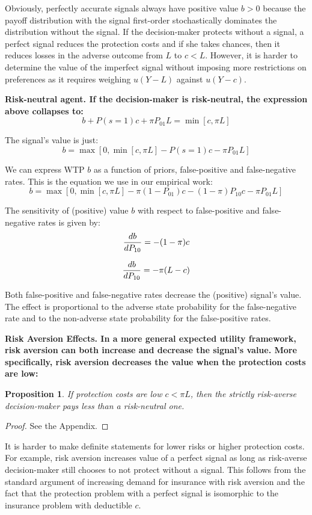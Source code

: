 \documentclass[12pt,a4paper]{article}
\newtheorem{theorem}{Proposition}
\begin{document}
Obviously, perfectly accurate signals always have positive value $b>0$ because the payoff distribution with the signal first-order stochastically dominates the distribution without the signal. If the decision-maker protects without a signal, a perfect signal reduces the protection costs and if she takes chances, then it reduces losses in the adverse outcome from $L$ to $c<L$.  However, it is harder to determine the value of the imperfect signal without imposing more restrictions on preferences as it requires weighing $u(Y-L)$ against $u(Y-c)$.


\vspace{10pt}
\bf Risk-neutral agent. \rm If the decision-maker is risk-neutral, the expression above collapses to:
$$b+P(s=1)c+\pi P_{01}L=\min[c,\pi L]$$

The signal's value is just:
\begin{equation}
b=\max[0,\min[c,\pi L]-P(s=1)c-\pi P_{01}L]
\end{equation}

We can express WTP $b$ as a function of priors, false-positive and false-negative rates. This is the equation we use in our empirical work:
\begin{equation}
b=\max[0,\min[c,\pi L]-\pi (1-P_{01})c-(1-\pi)P_{10}c-\pi P_{01}L]
\end{equation}

The sensitivity of (positive) value $b$ with respect to false-positive and false-negative rates is given by:
\begin{equation}
{db\over dP_{10}}=-(1-\pi)c
\end{equation}

\begin{equation}
{db\over dP_{10}}=-\pi(L-c)
\end{equation}
\vspace{10pt}

Both false-positive and false-negative rates decrease the (positive) signal's value. The effect is proportional to the adverse state probability for the false-negative rate and to the non-adverse state probability for the false-positive rates.

\vspace{10pt}
\bf Risk Aversion Effects. \rm In a more general expected utility framework, risk aversion can both increase and decrease the signal's value. More specifically, risk aversion decreases the value when the protection costs are low: 

\begin{theorem}
 If protection costs are low $c<\pi L$, then the strictly risk-averse decision-maker pays less than a risk-neutral one.
\end{theorem} 
\begin{proof}
See the Appendix.
\end{proof}
It is harder to make definite statements for lower risks or higher protection costs. For example, risk aversion increases value of a perfect signal as long as risk-averse decision-maker still chooses to not protect without a signal. This follows from the standard argument of increasing demand for insurance with risk aversion and the fact that the protection problem with a perfect signal is isomorphic to the insurance problem with deductible $c$. 
\end{document}
